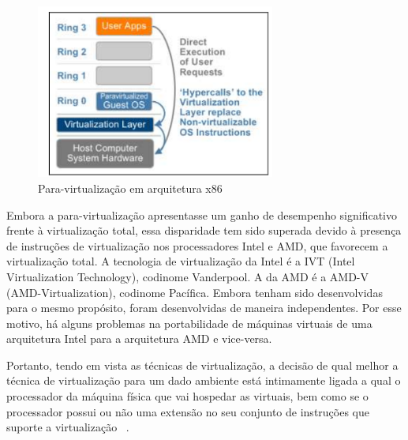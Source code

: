 \begin{figure}
	\begin{center}
    	\includegraphics[width=0.7\textwidth]{virtualizacao2}
    \end{center}
    \caption{Para-virtualização em arquitetura x86~\cite{ferrazani}}
    \label{fig:virtualizacao2}

\end{figure}

Embora a para-virtualização apresentasse um ganho de desempenho significativo frente à virtualização total, essa disparidade tem sido superada devido à presença de instruções de virtualização nos processadores Intel e AMD, que favorecem a virtualização total. A tecnologia de virtualização da Intel é a IVT (Intel Virtualization Technology), codinome Vanderpool. A da AMD é a AMD-V (AMD-Virtualization), codinome Pacífica. Embora tenham sido desenvolvidas para o mesmo propósito, foram desenvolvidas de maneira independentes. Por esse motivo, há alguns problemas na portabilidade de máquinas virtuais de uma arquitetura Intel para a arquitetura AMD e vice-versa.

Portanto, tendo em vista as técnicas de virtualização, a decisão de qual melhor a técnica de virtualização para um dado ambiente está intimamente ligada a qual o processador da máquina física que vai hospedar as virtuais, bem como se o processador possui ou não uma extensão no seu conjunto de instruções que suporte a virtualização ~\cite{ferrazani}.

